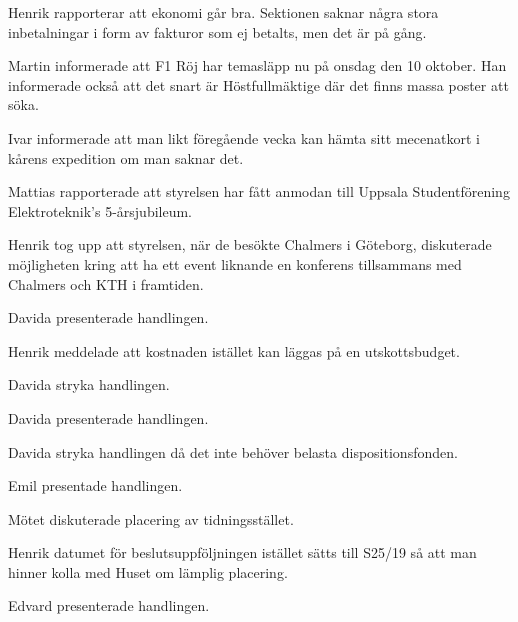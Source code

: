 \documentclass[10pt]{article}
\begin{document}
\begin{paragrafer}
\begin{paragrafer}

Henrik rapporterar att ekonomi går bra. Sektionen saknar några stora inbetalningar i form av fakturor som ej betalts, men det är på gång.  



Martin informerade att F1 Röj har temasläpp nu på onsdag den 10 oktober. Han informerade också att det snart är Höstfullmäktige där det finns massa poster att söka.


Ivar informerade att man likt föregående vecka kan hämta sitt mecenatkort i kårens expedition om man saknar det. 




Mattias rapporterade att styrelsen har fått anmodan till Uppsala Studentförening Elektroteknik's 5-årsjubileum.

Henrik tog upp att styrelsen, när de besökte Chalmers i Göteborg, diskuterade möjligheten kring att ha ett event liknande en konferens tillsammans med Chalmers och KTH i framtiden.

\end{paragrafer}




Davida presenterade handlingen.

Henrik meddelade att kostnaden istället kan läggas på en utskottsbudget. 

Davida \ypa stryka handlingen. 

\Mbaby


Davida presenterade handlingen. 

Davida \ypa stryka handlingen då det inte behöver belasta dispositionsfonden.

\Mbaby


Emil presentade handlingen. 

Mötet diskuterade placering av tidningsstället. 

Henrik \ypa datumet för beslutsuppföljningen istället sätts till S25/19 så att man hinner kolla med Huset om lämplig placering. 

\Mbabay

Edvard presenterade handlingen. 


\end{paragrafer}
\end{document}
